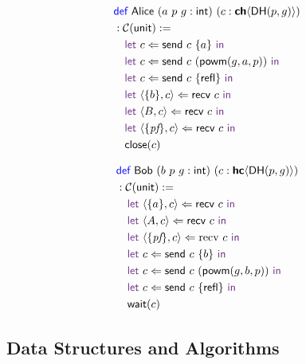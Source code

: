 \begin{center}
\begin{minipage}{0.4\textwidth}
\begingroup
\small
\addtolength{\jot}{-0.2em}
\begin{alignat*}{4}
  &\Def\ \textsf{Alice}\ (a\ p\ g: \textsf{int})\ (c : \CH{\textsf{DH}(p,g)}) \\
  &: \CM{\textsf{unit}} := \\
  &\quad\Let\ c \Leftarrow \textsf{send}\ c\ \{ a \}\ \In \\
  &\quad\Let\ c \Leftarrow \textsf{send}\ c\ (\textsf{powm}(g, a, p))\ \In \\
  &\quad\Let\ c \Leftarrow \textsf{send}\ c\ \{\textsf{refl}\}\ \In \\
  &\quad\Let\ \langle{\{b\}, c}\rangle \Leftarrow \textsf{recv}\ c\ \In \\
  &\quad\Let\ \langle{B, c}\rangle \Leftarrow \textsf{recv}\ c\ \In \\
  &\quad\Let\ \langle{\{\textit{pf}\}, c}\rangle \Leftarrow \textsf{recv}\ c\ \In \\
  &\quad\textsf{close}(c)
\end{alignat*}
\endgroup
\end{minipage}
\begin{minipage}{0.5\textwidth}
\begingroup
\small
\addtolength{\jot}{-0.2em}
\begin{alignat*}{4}
  &\Def\ \textsf{Bob}\ (b\ p\ g: \textsf{int})\ (c : \HC{\textsf{DH}(p,g)}) \\
  &: \CM{\textsf{unit}} := \\
  &\quad\Let\ \langle{\{a\}, c}\rangle \Leftarrow \textsf{recv}\ c\ \In \\
  &\quad\Let\ \langle{A, c}\rangle \Leftarrow \textsf{recv}\ c\ \In \\
  &\quad\Let\ \langle{\{\textit{pf}\}, c}\rangle \Leftarrow \text{recv}\ c\ \In \\
  &\quad\Let\ c \Leftarrow \textsf{send}\ c\ \{ b \}\ \In \\
  &\quad\Let\ c \Leftarrow \textsf{send}\ c\ (\textsf{powm}(g, b, p))\ \In \\
  &\quad\Let\ c \Leftarrow \textsf{send}\ c\ \{\textsf{refl}\}\ \In \\
  &\quad\textsf{wait}(c)
\end{alignat*}
\endgroup
\end{minipage}
\end{center}





\subsection{Data Structures and Algorithms}



